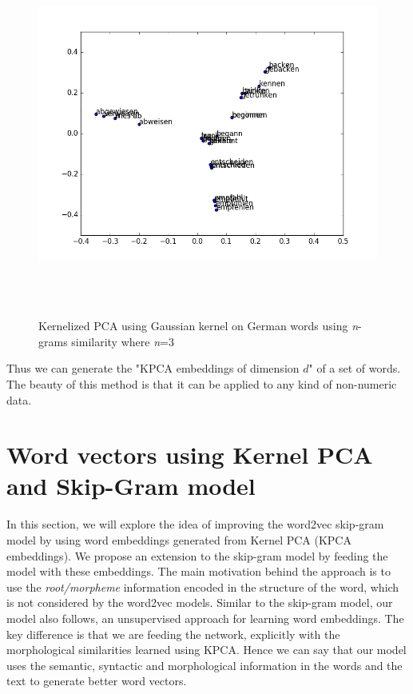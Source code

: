   \begin{figure}[H]
 	\centering
 	\includegraphics[width=15cm,height=12cm,keepaspectratio]{files/KERNELPCA/gaussianN3de.png}
 	\caption{Kernelized PCA using Gaussian kernel on German words using \textit{n}-grams similarity where \textit{n}=3}
 	\label{fig:kgaussiande}
 \end{figure}
Thus we can generate the "KPCA embeddings of dimension $\mathit{d}$" of a set of words. The beauty of this method is that it can be applied to any kind of non-numeric data. 
\section{Word vectors using Kernel PCA and Skip-Gram model}
 In this section, we will explore the idea of improving the word2vec skip-gram model by using word embeddings generated from Kernel PCA (KPCA embeddings). We propose an extension to the skip-gram model by feeding the model with these embeddings. The main motivation behind the approach is to use the \textit{root/morpheme} information encoded in the structure of the word, which is not considered by the word2vec models. Similar to the skip-gram model, our model also follows, an unsupervised approach for learning word embeddings. The key difference is that we are feeding the network, explicitly with the morphological similarities learned using KPCA. Hence we can say that our model uses the semantic, syntactic and morphological information in the words and the text to generate better word vectors.
